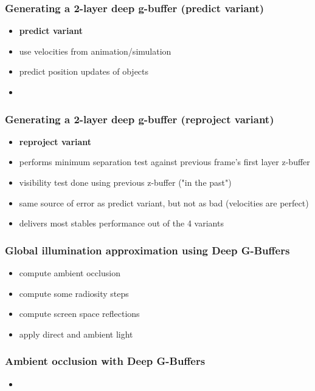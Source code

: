 \documentclass[aspectratio=169]{beamer}
\begin{document}
	\begin{frame}
		\frametitle{Generating a 2-layer deep g-buffer (predict variant)}
		\begin{itemize}
			\item \textbf{predict variant}
			\item use velocities from animation/simulation
			\item predict position updates of objects
			\item 
		\end{itemize}
	\end{frame}	

	\begin{frame}
		\frametitle{Generating a 2-layer deep g-buffer (reproject variant)}
		\begin{itemize}
			\item \textbf{reproject variant}
			\item performs minimum separation test against previous frame's first layer z-buffer
			\item visibility test done using previous z-buffer ("in the past")
			\item same source of error as predict variant, but not as bad (velocities are perfect)
			\item delivers most stables performance out of the 4 variants
			
		\end{itemize}
	\end{frame}	

	\begin{frame}
		\frametitle{Global illumination approximation using Deep G-Buffers}
		\begin{itemize}
			\item compute ambient occlusion 
			\item compute some radiosity steps
			\item compute screen space reflections
			\item apply direct and ambient light
		\end{itemize}
	\end{frame}	

	\begin{frame}
		\frametitle{Ambient occlusion with Deep G-Buffers}
		\begin{itemize}
			\item 
			
		\end{itemize}
	\end{frame}	
\end{document}
